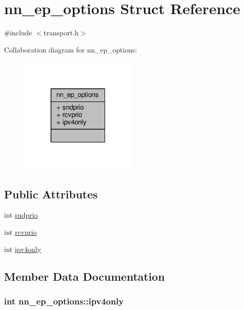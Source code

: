 \hypertarget{structnn__ep__options}{}\section{nn\+\_\+ep\+\_\+options Struct Reference}
\label{structnn__ep__options}


{\ttfamily \#include $<$transport.\+h$>$}



Collaboration diagram for nn\+\_\+ep\+\_\+options\+:\nopagebreak
\begin{figure}[H]
\begin{center}
\leavevmode
\includegraphics[width=160pt]{structnn__ep__options__coll__graph}
\end{center}
\end{figure}
\subsection*{Public Attributes}
\begin{DoxyCompactItemize}
\item 
int \hyperlink{structnn__ep__options_a094beafa8c4733b413c5982c9ab7552d}{sndprio}
\item 
int \hyperlink{structnn__ep__options_ad767f9fdbda05049cdb00e5122de9c7f}{rcvprio}
\item 
int \hyperlink{structnn__ep__options_a59ff01ae4c3e14629355a72a88cab1c1}{ipv4only}
\end{DoxyCompactItemize}


\subsection{Member Data Documentation}
\subsubsection[{ipv4only}]{\setlength{\rightskip}{0pt plus 5cm}int nn\+\_\+ep\+\_\+options\+::ipv4only}\hypertarget{structnn__ep__options_a59ff01ae4c3e14629355a72a88cab1c1}{}\label{structnn__ep__options_a59ff01ae4c3e14629355a72a88cab1c1}
